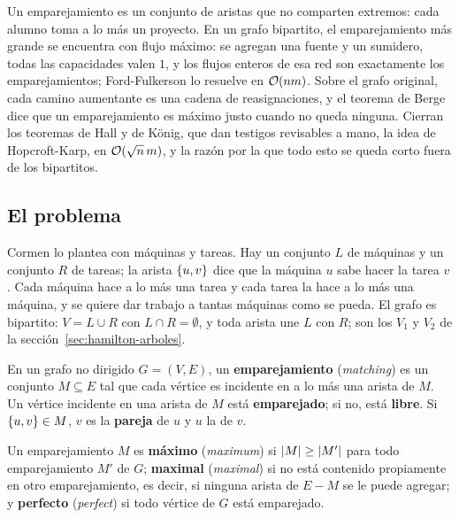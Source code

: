 \documentclass[11pt,letterpaper]{article}
\begin{document}
\label{sec:emparejamiento}

\begin{quick_sum}
  Un emparejamiento es un conjunto de aristas que no comparten
  extremos: cada alumno toma a lo más un proyecto. En un grafo
  bipartito, el emparejamiento más grande se encuentra con flujo
  máximo: se agregan una fuente y un sumidero, todas las capacidades
  valen $1$, y los flujos enteros de esa red son exactamente los
  emparejamientos; Ford-Fulkerson lo resuelve en $\mathcal{O}\!\left(nm\right)$. Sobre el
  grafo original, cada camino aumentante es una cadena de
  reasignaciones, y el teorema de Berge dice que un emparejamiento es
  máximo justo cuando no queda ninguna. Cierran los teoremas de Hall y
  de König, que dan testigos revisables a mano, la idea de
  Hopcroft-Karp, en $\mathcal{O}\!\left(\sqrt{n}\, m\right)$, y la razón por la que todo
  esto se queda corto fuera de los bipartitos.
\end{quick_sum}

\subsection*{El problema}

Cormen lo plantea con máquinas y tareas. Hay un conjunto $L$ de
máquinas y un conjunto $R$ de tareas; la arista $\left\{ u, v \right\}$ dice que
la máquina $u$ sabe hacer la tarea $v$. Cada máquina hace a lo más una
tarea y cada tarea la hace a lo más una máquina, y se quiere dar
trabajo a tantas máquinas como se pueda. El grafo es bipartito:
$V = L \cup R$ con $L \cap R = \emptyset$, y toda arista une $L$ con
$R$; son los $V_1$ y $V_2$ de la sección~\ref{sec:hamilton-arboles}.

\begin{definicion}[Emparejamiento]
  \label{def:emparejamiento}
  En un grafo no dirigido $G = (V, E)$, un \textbf{emparejamiento}
  (\textit{matching}) es un conjunto $M \subseteq E$ tal que cada
  vértice es incidente en a lo más una arista de $M$. Un vértice
  incidente en una arista de $M$ está \textbf{emparejado}; si no,
  está \textbf{libre}. Si $\left\{ u, v \right\} \in M$, $v$ es la
  \textbf{pareja} de $u$ y $u$ la de $v$.
\end{definicion}

\begin{definicion}
  \label{def:emparejamiento-maximo}
  Un emparejamiento $M$ es \textbf{máximo} (\textit{maximum}) si
  $\left\lvert M \right\rvert \ge \left\lvert M' \right\rvert$ para todo emparejamiento $M'$ de $G$;
  \textbf{maximal} (\textit{maximal}) si no está contenido propiamente
  en otro emparejamiento, es decir, si ninguna arista de $E - M$ se le
  puede agregar; y \textbf{perfecto} (\textit{perfect}) si todo
  vértice de $G$ está emparejado.
\end{definicion}
\end{document}
